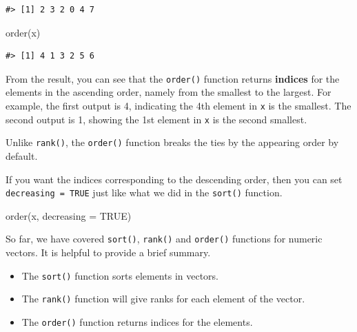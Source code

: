 \documentclass[
]{book}
\newenvironment{Shaded}{\begin{snugshade}}{\end{snugshade}}
\newcommand{\AttributeTok}[1]{\textcolor[rgb]{0.77,0.63,0.00}{#1}}
\newcommand{\ConstantTok}[1]{\textcolor[rgb]{0.00,0.00,0.00}{#1}}
\newcommand{\FunctionTok}[1]{\textcolor[rgb]{0.00,0.00,0.00}{#1}}
\newcommand{\NormalTok}[1]{#1}
\providecommand{\tightlist}{%
  \setlength{\itemsep}{0pt}\setlength{\parskip}{0pt}}
\newenvironment{infobox}[1]
  {
  \begin{itemize}
  \renewcommand{\labelitemi}{
    \raisebox{-.7\height}[0pt][0pt]{
      {\setkeys{Gin}{width=3em,keepaspectratio}
        \texttt{[image: pics/\#1]}}
    }
  }
  \setlength{\fboxsep}{1em}
  \begin{blackbox}
  \item
  }
  {
  \end{blackbox}
  \end{itemize}
  }
\newenvironment{blackbox}{
  \definecolor{shadecolor}{rgb}{0, 0, 0}  %
  \color{white}
  \begin{shaded}}
 {\end{shaded}}
\begin{document}
\begin{verbatim}
#> [1] 2 3 2 0 4 7
\end{verbatim}

\begin{Shaded}
\begin{Highlighting}[]
\FunctionTok{order}\NormalTok{(x)}
\end{Highlighting}
\end{Shaded}

\begin{verbatim}
#> [1] 4 1 3 2 5 6
\end{verbatim}

From the result, you can see that the \texttt{order()} function returns \textbf{indices} for the elements in the ascending order, namely from the smallest to the largest. For example, the first output is 4, indicating the 4th element in \texttt{x} is the smallest. The second output is 1, showing the 1st element in \texttt{x} is the second smallest.

\begin{infobox}{caution}
Unlike \texttt{rank()}, the \texttt{order()} function breaks the ties by the appearing order by default.

\end{infobox}

If you want the indices corresponding to the descending order, then you can set \texttt{decreasing\ =\ TRUE} just like what we did in the \texttt{sort()} function.

\begin{Shaded}
\begin{Highlighting}[]
\FunctionTok{order}\NormalTok{(x, }\AttributeTok{decreasing =} \ConstantTok{TRUE}\NormalTok{)  }
\end{Highlighting}
\end{Shaded}

So far, we have covered \texttt{sort()}, \texttt{rank()} and \texttt{order()} functions for numeric vectors. It is helpful to provide a brief summary.

\begin{itemize}
\tightlist
\item
  The \texttt{sort()} function sorts elements in vectors.
\item
  The \texttt{rank()} function will give ranks for each element of the vector.
\item
  The \texttt{order()} function returns indices for the elements.
\end{itemize}
\end{document}
